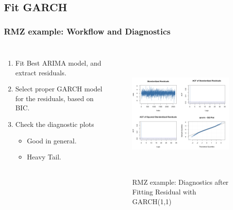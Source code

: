 \documentclass{beamer}
\newcommand\Fontviii{\fontsize{8}{9.2}\selectfont}
\begin{document}
\subsection{Fit GARCH}
\begin{frame}
\frametitle{RMZ example: Workflow and Diagnostics}
\Fontviii
\begin{columns}[c]
\begin{enumerate}
\item Fit Best ARIMA model, and extract residuals.
\item Select proper GARCH model for the residuals, based on BIC.
\item Check the diagnostic plots
\begin{itemize}
\item Good in general.
\item Heavy Tail.
\end{itemize}
\end{enumerate}
 
 
\begin{figure}[h]
\centering 
\includegraphics[width=6cm,height = 6cm]{../results/RMZ_GARCH_dig1}
\label{fig:RMZ_GARCH_dig1}
\caption{RMZ example: Diagnostics after Fitting Residual with GARCH(1,1)}
\end{figure}

\end{columns}
\end{frame}
\end{document}
